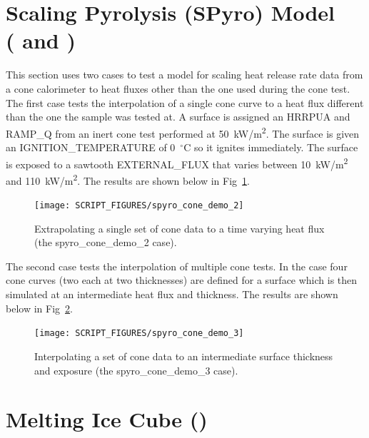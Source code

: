 \documentclass[11pt]{book}
\begin{document}
\newpage

\section{Scaling Pyrolysis (SPyro) Model \\
(\texorpdfstring{ and }{spyro\_cone\_demo\_2 and spyro\_cone\_demo\_3})}
\label{spyro_cone_demo_2}
\label{spyro_cone_demo_3}

This section uses two cases to test a model for scaling heat release rate data from a cone calorimeter to heat fluxes other than the one used during the cone test. The first case tests the interpolation of a single cone curve to a heat flux different than the one the sample was tested at. A surface is assigned an {\ct HRRPUA} and {\ct RAMP\_Q} from an inert cone test performed at 50~\si{kW/m^2}. The surface is given an {\ct IGNITION\_TEMPERATURE} of 0~$^\circ$C so it ignites immediately. The surface is exposed to a sawtooth {\ct EXTERNAL\_FLUX} that varies between 10~\si{kW/m^2} and 110~\si{kW/m^2}. The results are shown below in Fig~\ref{fig:spyro_cone_demo_2}.

\begin{figure}[!ht]
    \centering
    \texttt{[image: SCRIPT\_FIGURES/spyro\_cone\_demo\_2]}
    \caption[Check of the Scaling Pyrolysis (SPryo) model (the  case)]{Extrapolating a single set of cone data to a time varying heat flux (the {\ct spyro\_cone\_demo\_2} case).}
    \label{fig:spyro_cone_demo_2}
\end{figure}

The second case tests the interpolation of multiple cone tests. In the case four cone curves (two each at two thicknesses) are defined for a surface which is then simulated at an intermediate heat flux and thickness. The results are shown below in Fig~\ref{fig:spyro_cone_demo_3}.

\begin{figure}[!ht]
    \centering
    \texttt{[image: SCRIPT\_FIGURES/spyro\_cone\_demo\_3]}
    \caption[Check of the Scaling Pyrolysis (SPryo) model (the  case)]{Interpolating a set of cone data to an intermediate surface thickness and exposure (the {\ct spyro\_cone\_demo\_3} case).}
    \label{fig:spyro_cone_demo_3}
\end{figure}

\section{Melting Ice Cube (\texorpdfstring{}{ice\_cube})}
\label{ice_cube}
\end{document}

